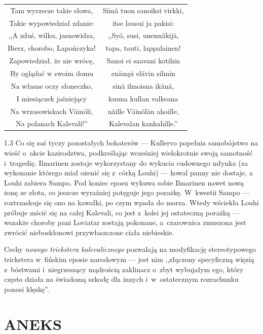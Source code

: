 \documentclass[11pt,a4paper,twoside]{report}
\begin{document}
\newpage
{\centering
\small
\begin{longtable}{c c}
Tam wyrzecze takie słowa, & Siinä tuon sanoiksi virkki,\\
Takie wypowiedział zdanie: & itse lausui ja pakisi:\\
,,A zduś, wilku, jasnowidza, & ,,Syö, susi, unennäkijä,\\
Bierz, chorobo, Lapończyka! & tapa, tauti, lappalainen!\\
Zapowiedział, że nie wrócę, & Sanoi ei saavani kotihin\\
By oglądać w swoim domu & enämpi elävin silmin\\
Na własne oczy słoneczko, & sinä ilmoisna ikänä,\\
I miesiączek jaśniejący & kuuna kullan valkeana\\
Na wrzosowiskach Väinöli, & näille Väinölän ahoille,\\
Na polanach Kalevali!'' & Kalevalan kankahille.''\\
\end{longtable}
}
\begin{spacing}{1.3}
Co się zaś tyczy pozostałych bohaterów --- Kullervo popełnia samobójstwo na wieść o~akcie kazirodztwa, podkreślając wcześniej wielokrotnie swoją samotność i~tragedię. Ilmarinen zostaje wykorzystany do wykucia cudownego młynka (za wykonanie którego miał ożenić się z~córką Louhi) --- kowal panny nie dostaje, a Louhi zabiera Sampo. Pod koniec eposu wykuwa sobie Ilmarinen nawet nową żonę ze złota, co jeszcze wyraźniej potęguje jego porażkę. W~kwestii Sampo --- roztrzaskuje się ono na kawałki, po czym wpada do morza. Wtedy wściekła Louhi próbuje mścić się na całej Kalevali, co jest z~kolei jej ostateczną porażką --- wszakże choroby pani Loviatar zostają pokonane, a~czarownica zmuszona jest zwrócić nieboskłonowi przywłaszczone ciała niebieskie.

Cechy \emph{nowego trickstera kalevalicznego} pozwalają na modyfikację stereotypowego trickstera w~fińskim eposie narodowym --- jest nim ,,złączony specyficzną więzią z~bóstwami i~niegrzeszący mądrością zaklinacz o~zbyt wybujałym ego, który często działa na świadomą szkodę dla innych i~w~ostatecznym rozrachunku ponosi klęskę''.
\end{spacing}

\clearpage{\pagestyle{empty}\cleardoublepage}
\part{ANEKS}
\clearpage{\pagestyle{empty}\cleardoublepage}
\end{document}
